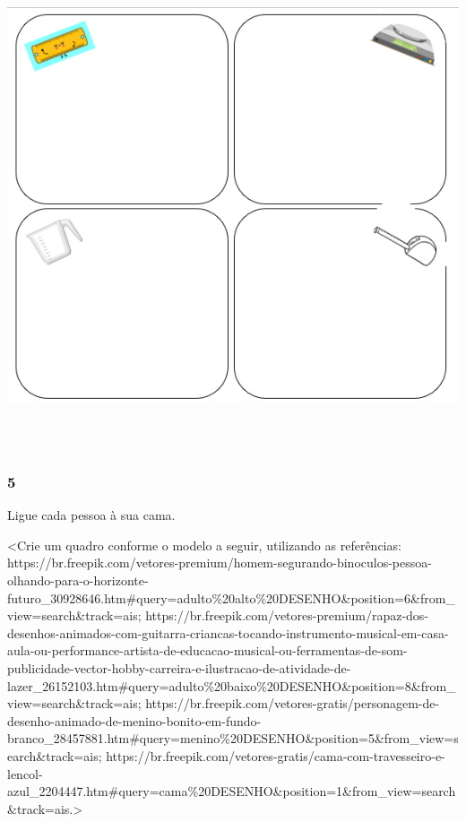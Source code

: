 \includegraphics[width=6.43650in,height=5.62891in]{media/image26.png}

\subsubsection{5}\label{section-31}

Ligue cada pessoa à sua cama.

\textless{}Crie um quadro conforme o modelo a seguir, utilizando as
referências:
https://br.freepik.com/vetores-premium/homem-segurando-binoculos-pessoa-olhando-para-o-horizonte-futuro\_30928646.htm\#query=adulto\%20alto\%20DESENHO\&position=6\&from\_view=search\&track=ais;
https://br.freepik.com/vetores-premium/rapaz-dos-desenhos-animados-com-guitarra-criancas-tocando-instrumento-musical-em-casa-aula-ou-performance-artista-de-educacao-musical-ou-ferramentas-de-som-publicidade-vector-hobby-carreira-e-ilustracao-de-atividade-de-lazer\_26152103.htm\#query=adulto\%20baixo\%20DESENHO\&position=8\&from\_view=search\&track=ais;
https://br.freepik.com/vetores-gratis/personagem-de-desenho-animado-de-menino-bonito-em-fundo-branco\_28457881.htm\#query=menino\%20DESENHO\&position=5\&from\_view=search\&track=ais;
https://br.freepik.com/vetores-gratis/cama-com-travesseiro-e-lencol-azul\_2204447.htm\#query=cama\%20DESENHO\&position=1\&from\_view=search\&track=ais.\textgreater{}

